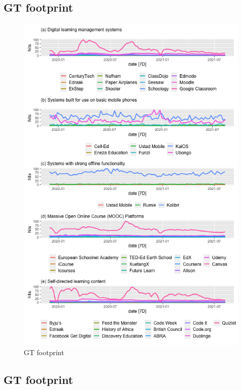 \documentclass[11pt,a4paper,]{article}
\begin{document}
\newpage

\hypertarget{gt-footprint}{%
\subsection{GT footprint}\label{gt-footprint}}

\begin{figure}[h]

{\centering \includegraphics[width=1\textwidth]{figure/plot1-1} 

}

\caption{GT footprint}\label{fig:plot1}
\end{figure}

\newpage

\hypertarget{gt-footprint-1}{%
\subsection{GT footprint}\label{gt-footprint-1}}
\end{document}
